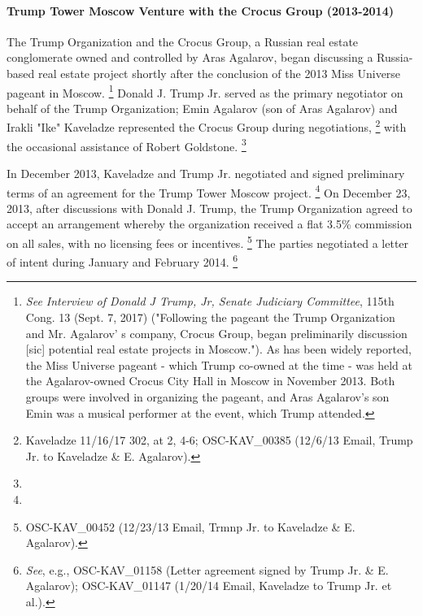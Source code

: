 \paragraph{Trump Tower Moscow Venture with the Crocus Group (2013-2014)}

The Trump Organization and the Crocus Group, a Russian real estate conglomerate owned and controlled by Aras Agalarov, began discussing a Russia-based real estate project shortly after the conclusion of the 2013 Miss Universe pageant in Moscow.%
\footnote{\textit{See Interview of Donald J Trump, Jr, Senate Judiciary Committee}, 115th Cong. 13 (Sept. 7, 2017) ("Following the pageant the Trump Organization and Mr. Agalarov' s company, Crocus Group, began preliminarily discussion [sic] potential real estate projects in Moscow.").
As has been widely reported, the Miss Universe pageant - which Trump co-owned at the time - was held at the Agalarov-owned Crocus City Hall in Moscow in November
2013. Both groups were involved in organizing the pageant, and Aras Agalarov's son Emin was a musical performer at the event, which Trump attended.}
Donald J. Trump Jr. served as the primary negotiator on behalf of the Trump Organization; Emin Agalarov (son of Aras Agalarov) and Irakli "Ike" Kaveladze represented the Crocus Group during negotiations,%
\footnote{Kaveladze 11/16/17 302, at 2, 4-6;  OSC-KAV\_00385 (12/6/13 Email, Trump Jr. to Kaveladze \& E. Agalarov).}
with the occasional assistance of Robert Goldstone.%
\footnote{}

In December 2013, Kaveladze and Trump Jr. negotiated and signed preliminary terms of an agreement for the Trump Tower Moscow project.%
\footnote{}
On December 23, 2013, after discussions with Donald J. Trump, the Trump Organization agreed to accept an arrangement whereby the organization received a flat 3.5\% commission on all sales, with no licensing fees or incentives.%
\footnote{OSC-KAV\_00452 (12/23/13 Email, Trmnp Jr. to Kaveladze \& E. Agalarov).}
The parties negotiated a letter of intent during January and February 2014.%
\footnote{\textit{See}, e.g., OSC-KAV\_01158 (Letter agreement signed by Trump Jr. \& E. Agalarov); OSC-KAV\_01147 (1/20/14 Email, Kaveladze to Trump Jr. et al.).}

